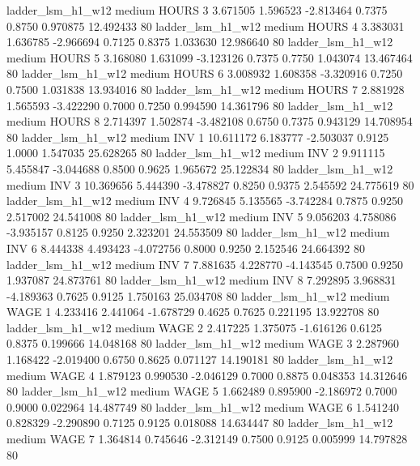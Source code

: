      ladder_lsm_h1_w12     medium    HOURS                 3  3.671505 1.596523 -2.813464 0.7375 0.8750  0.970875   12.492433 80
     ladder_lsm_h1_w12     medium    HOURS                 4  3.383031 1.636785 -2.966694 0.7125 0.8375  1.033630   12.986640 80
     ladder_lsm_h1_w12     medium    HOURS                 5  3.168080 1.631099 -3.123126 0.7375 0.7750  1.043074   13.467464 80
     ladder_lsm_h1_w12     medium    HOURS                 6  3.008932 1.608358 -3.320916 0.7250 0.7500  1.031838   13.934016 80
     ladder_lsm_h1_w12     medium    HOURS                 7  2.881928 1.565593 -3.422290 0.7000 0.7250  0.994590   14.361796 80
     ladder_lsm_h1_w12     medium    HOURS                 8  2.714397 1.502874 -3.482108 0.6750 0.7375  0.943129   14.708954 80
     ladder_lsm_h1_w12     medium      INV                 1 10.611172 6.183777 -2.503037 0.9125 1.0000  1.547035   25.628265 80
     ladder_lsm_h1_w12     medium      INV                 2  9.911115 5.455847 -3.044688 0.8500 0.9625  1.965672   25.122834 80
     ladder_lsm_h1_w12     medium      INV                 3 10.369656 5.444390 -3.478827 0.8250 0.9375  2.545592   24.775619 80
     ladder_lsm_h1_w12     medium      INV                 4  9.726845 5.135565 -3.742284 0.7875 0.9250  2.517002   24.541008 80
     ladder_lsm_h1_w12     medium      INV                 5  9.056203 4.758086 -3.935157 0.8125 0.9250  2.323201   24.553509 80
     ladder_lsm_h1_w12     medium      INV                 6  8.444338 4.493423 -4.072756 0.8000 0.9250  2.152546   24.664392 80
     ladder_lsm_h1_w12     medium      INV                 7  7.881635 4.228770 -4.143545 0.7500 0.9250  1.937087   24.873761 80
     ladder_lsm_h1_w12     medium      INV                 8  7.292895 3.968831 -4.189363 0.7625 0.9125  1.750163   25.034708 80
     ladder_lsm_h1_w12     medium     WAGE                 1  4.233416 2.441064 -1.678729 0.4625 0.7625  0.221195   13.922708 80
     ladder_lsm_h1_w12     medium     WAGE                 2  2.417225 1.375075 -1.616126 0.6125 0.8375  0.199666   14.048168 80
     ladder_lsm_h1_w12     medium     WAGE                 3  2.287960 1.168422 -2.019400 0.6750 0.8625  0.071127   14.190181 80
     ladder_lsm_h1_w12     medium     WAGE                 4  1.879123 0.990530 -2.046129 0.7000 0.8875  0.048353   14.312646 80
     ladder_lsm_h1_w12     medium     WAGE                 5  1.662489 0.895900 -2.186972 0.7000 0.9000  0.022964   14.487749 80
     ladder_lsm_h1_w12     medium     WAGE                 6  1.541240 0.828329 -2.290890 0.7125 0.9125  0.018088   14.634447 80
     ladder_lsm_h1_w12     medium     WAGE                 7  1.364814 0.745646 -2.312149 0.7500 0.9125  0.005999   14.797828 80
